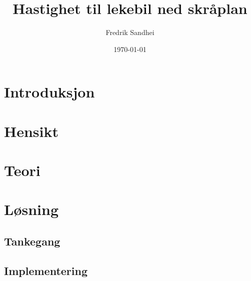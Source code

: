 \documentclass[11pt, a4paper]{article}
\begin{document}
\title{Hastighet til lekebil ned skråplan}
\author{Fredrik Sandhei}
\date{\today}
\maketitle

\section{Introduksjon}

\section{Hensikt}

\section{Teori}

\section{Løsning}
\subsection{Tankegang}
\subsection{Implementering}
\end{document}
